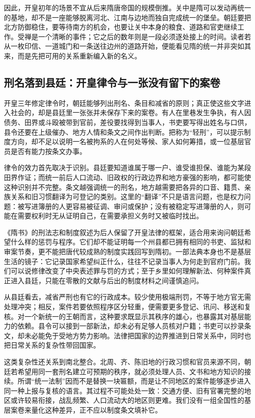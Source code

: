 因此，开皇初年的场景不宜从后来隋唐帝国的规模倒推。关中是隋可以发动再统一的基地，却不是一座能够脱离河北、江南与边地而独自完成统一的堡垒。朝廷要把北方防御稳住，要等待南方的机会，也要让关中本身的粮食、道路和官吏继续工作。受禅是一个清晰的事件；它之后的数年则是一段必须逐处接上的时间。读者若从一枚印信、一道城门和一条送往边州的道路开始，便能看见隋的统一并非突如其来，而是先把可用的关系重新编入新的名义。

\subsection{刑名落到县廷：开皇律令与一张没有留下的案卷}
开皇三年修定律令时，朝廷能够列出刑名、条目和减省的原则；真正使这些文字进入社会的，却是县廷里一张张并未保存下来的案卷。有人在里巷发生争执，有人因债务、田界或斗殴被带到官前，差役要找得到当事人，书吏要写得出姓名与口供，县令还要在上级催办、地方人情和条文之间作出判断。把称为“轻刑”，可以提示制度方向，却不足以说明一名被拘系的人在何处等候、家人如何筹措，或一位基层官员是否有能力按条文办事。

律令的效力首先取决于识别。县廷要知道谁属于哪一户、谁受谁担保、谁能为某段田界作证；而统一前后人口流动、旧政权的行政边界和地方豪强的影响，都可能使这种识别并不完整。条文越强调统一的刑名，地方越需要把各异的口音、籍贯、亲族关系和旧习惯翻译为可登记的类别。这里的“翻译”不只是语言问题，也是权力问题：被写进簿册的人更容易被征调、审问或保护；没有被稳定写进簿册的人，则可能在需要权利时无从证明自己，在需要承担义务时又被临时找出。

《隋书》的刑法志和制度叙述为后人保留了开皇法律的框架，适合用来询问朝廷希望什么样的惩罚与程序。它们却不能证明每一个州县都已拥有相同的书吏、监狱和审案节奏，更不能把唐代较成熟的制度实践回写到隋初。一部法典本身也不是基层生活的镜子：它记录国家希望纠正什么，往往不记录当事人为何走到官府门前。我们可以说修律改变了中央表述罪与罚的方式；至于乡里如何理解新法、何种案件真正进入县廷，只能在零散的文献与后出的制度材料之间谨慎追问。

从县廷看去，减省严刑也有它的行政成本。较少使用极端刑罚，不等于地方官无需处理冲突；相反，案件若要依照程序区分轻重，便需要更多登记、讯问、移送和复核。对一个新统一的王朝而言，这种要求既显示其秩序的雄心，也暴露其对基层能力的依赖。县令可以接到一部新法，却未必有足够人员核对户籍；书吏可以抄录条文，却未必能免于受地方势力影响。法律把国家的边界推进到日常关系中，同时也把日常关系的复杂性带回国家。

这类复杂性还关系到南北整合。北周、齐、陈旧地的行政习惯和官员来源不同，朝廷若希望用同一套刑名建立可预期的秩序，就必须处理人员、文书和地方知识的接续。所谓“统一法制”因而不是替换一块匾额，而是让不同地区的案件能够逐步进入同一种上报与复核的语言。其过程不可能处处一致：交通方便、旧有官署完整的地区或许较易衔接，战乱频繁、人口流动大的地区则更难。我们没有一组全国性的基层案卷来量化这种差异，正不应以制度条文填补它。

